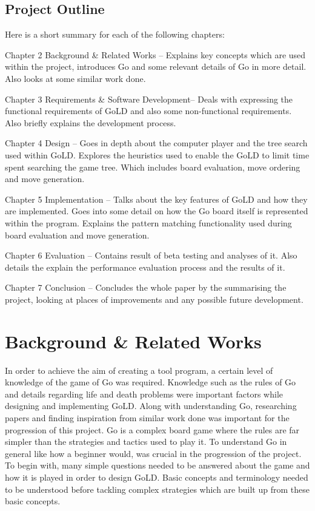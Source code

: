 \documentclass{l4proj}
\begin{document}
\section{Project Outline}

Here is a short summary for each of the following chapters:

Chapter 2 Background \& Related Works – Explains key concepts which are used within the project, introduces Go and some relevant details of Go in more detail. Also looks at some similar work done.

Chapter 3 Requirements \& Software Development– Deals with expressing the functional requirements of GoLD and also some non-functional requirements. Also briefly explains the development process.


Chapter 4 Design – Goes in depth about the computer player and the tree search used within GoLD.  Explores the heuristics used to enable the GoLD to limit time spent searching the game tree. Which includes board evaluation, move ordering and move generation.

Chapter 5 Implementation – Talks about the key features of GoLD and how they are implemented. Goes into some detail on how the Go board itself is represented within the program. Explains the pattern matching functionality used during board evaluation and move generation.

Chapter 6 Evaluation – Contains result of beta testing and analyses of it. Also details the explain the performance evaluation process and the results of it.

Chapter 7 Conclusion – Concludes the whole paper by the summarising the project, looking at places of improvements and any possible future development.






\chapter{Background \& Related Works}
In order to achieve the aim of creating a tool program, a certain level of knowledge of the game of Go was required. Knowledge such as the rules of Go and details regarding life and death problems were important factors while designing and implementing GoLD. Along with understanding Go, researching papers and finding inspiration from similar work done was important for the progression of this project.
Go is a complex board game where the rules are far simpler than the strategies and tactics used to play it. To understand Go in general like how a beginner would,  was crucial in the progression of the project. To begin with, many simple questions needed to be answered about the game and how it is played in order to design GoLD. Basic concepts and terminology needed to be understood before tackling complex strategies which are built up from these basic concepts.
\end{document}
